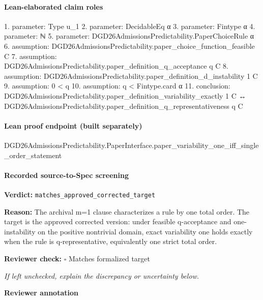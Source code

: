 \documentclass[10pt]{article}
\newcommand{\reviewerbox}{%
  \par\noindent\fbox{\parbox{0.96\linewidth}{\rule{0pt}{0.38in}}}\par
}
\newcommand{\reviewmatch}[1]{%
  \par\noindent\textbf{Reviewer check:} $\square$\; #1\par
  \noindent\emph{If left unchecked, explain the discrepancy or uncertainty below.}\par
}
\begin{document}
\paragraph{Lean-elaborated claim roles}\begin{ReviewVerbatim}
1. parameter: Type u_1
2. parameter: DecidableEq α
3. parameter: Fintype α
4. parameter: ℕ
5. parameter: DGD26AdmissionsPredictability.PaperChoiceRule α
6. assumption: DGD26AdmissionsPredictability.paper_choice_function_feasible C
7. assumption: DGD26AdmissionsPredictability.paper_definition_q_acceptance q C
8. assumption: DGD26AdmissionsPredictability.paper_definition_d_instability 1 C
9. assumption: 0 < q
10. assumption: q < Fintype.card α
11. conclusion: DGD26AdmissionsPredictability.paper_definition_variability_exactly 1 C ↔
  DGD26AdmissionsPredictability.paper_definition_q_representativeness q C
\end{ReviewVerbatim}

\paragraph{Lean proof endpoint (built separately)}\begin{ReviewVerbatim}
DGD26AdmissionsPredictability.PaperInterface.paper_variability_one_iff_single_order_statement
\end{ReviewVerbatim}

\paragraph{Recorded source-to-Spec screening}
\textbf{Verdict:} \texttt{matches\_approved\_corrected\_target}
\\
{\raggedright
\textbf{Reason:} The archival m=1 clause characterizes a rule by one total order.\allowbreak{} The target is the approved corrected version:\allowbreak{} under feasible q-\allowbreak{}acceptance and one-\allowbreak{}instability on the positive nontrivial domain, exact variability one holds exactly when the rule is q-\allowbreak{}representative, equivalently one strict total order.\allowbreak{}
\par}
\reviewmatch{Matches formalized target}
\noindent\textbf{Reviewer annotation}\par
\reviewerbox
\end{document}

